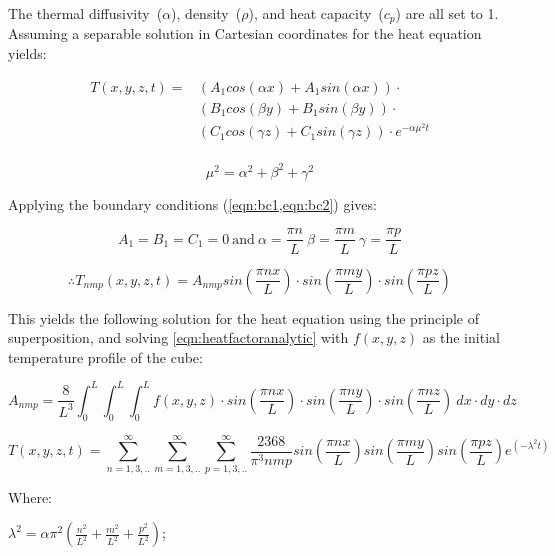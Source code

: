 The thermal diffusivity~($\alpha$), density~($\rho$), and heat capacity~($c_p$) are all set to 1. Assuming a separable solution in Cartesian coordinates for the heat equation yields:

\begin{equation}
\begin{split}
T(x,y,z,t)=&(A_1 cos(\alpha x) + A_1 sin(\alpha x))\cdot\\
&(B_1 cos(\beta y) + B_1 sin(\beta y))\cdot\\
&(C_1 cos(\gamma z) + C_1 sin(\gamma z))\cdot e^{-\alpha\mu^2t}\\
\end{split} 
\end{equation}

\begin{equation}
\mu^2=\alpha^2+\beta^2+\gamma^2
\end{equation}

Applying the boundary conditions (\cref{eqn:bc1,eqn:bc2}) gives:

\begin{equation}
A_1=B_1=C_1=0\
\text{and}\ \alpha=\frac{\pi n}{L}\ \beta=\frac{\pi m}{L}\ \gamma=\frac{\pi p}{L}
\end{equation}

\begin{equation}
\therefore  T_{nmp}(x,y,z,t)=A_{nmp} sin\left(\frac{\pi n x}{L}\right)\cdot sin\left(\frac{\pi m y}{L}\right)\cdot sin\left(\frac{\pi p z}{L}\right)
\end{equation}

This yields the following solution for the heat equation using the principle of superposition, and solving \cref{eqn:heatfactoranalytic} with $f(x,y,z)$ as the initial temperature profile of the cube:

\begin{equation}
A_{nmp}=\frac{8}{L^3}\int_0^L\int_0^L\int_0^L f(x,y,z)\cdot sin(\frac{\pi n x}{L})\cdot sin(\frac{\pi n y}{L})\cdot sin(\frac{\pi n z}{L})\ dx\cdot dy\cdot dz
\label{eqn:heatfactoranalytic}
\end{equation}

\begin{equation}
T(x,y,z,t)=\sum^\infty_{n=1,3,..}\sum^\infty_{m=1,3,..}\sum^\infty_{p=1,3,..}\frac{2368}{\pi^3nmp} sin(\frac{\pi n x}{L}) sin(\frac{\pi m y}{L}) sin(\frac{\pi p z}{L})e^{(-\lambda^2t)}
\end{equation}

\noindent Where:

	\indent $\lambda^2=\alpha\pi^2(\tfrac{n^2}{L^2}+\tfrac{m^2}{L^2}+\tfrac{p^2}{L^2})$;
	

